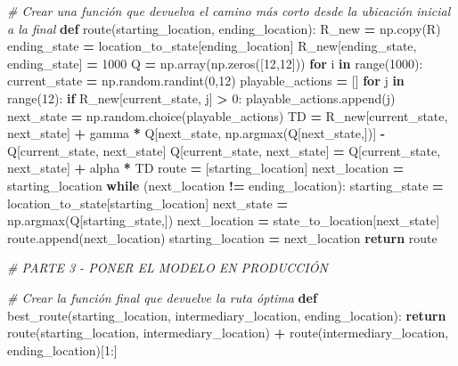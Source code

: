 \documentclass[
]{book}
\newenvironment{Shaded}{\begin{snugshade}}{\end{snugshade}}
\newcommand{\BuiltInTok}[1]{#1}
\newcommand{\CommentTok}[1]{\textcolor[rgb]{0.56,0.35,0.01}{\textit{#1}}}
\newcommand{\ControlFlowTok}[1]{\textcolor[rgb]{0.13,0.29,0.53}{\textbf{#1}}}
\newcommand{\DecValTok}[1]{\textcolor[rgb]{0.00,0.00,0.81}{#1}}
\newcommand{\KeywordTok}[1]{\textcolor[rgb]{0.13,0.29,0.53}{\textbf{#1}}}
\newcommand{\NormalTok}[1]{#1}
\newcommand{\OperatorTok}[1]{\textcolor[rgb]{0.81,0.36,0.00}{\textbf{#1}}}
\begin{document}
\begin{Shaded}
\begin{Highlighting}[]
\CommentTok{\# Crear una función que devuelva el camino más corto desde la ubicación inicial a la final}
\KeywordTok{def}\NormalTok{ route(starting\_location, ending\_location):}
\NormalTok{    R\_new }\OperatorTok{=}\NormalTok{ np.copy(R)}
\NormalTok{    ending\_state }\OperatorTok{=}\NormalTok{ location\_to\_state[ending\_location]}
\NormalTok{    R\_new[ending\_state, ending\_state] }\OperatorTok{=} \DecValTok{1000}
\NormalTok{    Q }\OperatorTok{=}\NormalTok{ np.array(np.zeros([}\DecValTok{12}\NormalTok{,}\DecValTok{12}\NormalTok{]))}
    \ControlFlowTok{for}\NormalTok{ i }\KeywordTok{in} \BuiltInTok{range}\NormalTok{(}\DecValTok{1000}\NormalTok{):}
\NormalTok{        current\_state }\OperatorTok{=}\NormalTok{ np.random.randint(}\DecValTok{0}\NormalTok{,}\DecValTok{12}\NormalTok{)}
\NormalTok{        playable\_actions }\OperatorTok{=}\NormalTok{ []}
        \ControlFlowTok{for}\NormalTok{ j }\KeywordTok{in} \BuiltInTok{range}\NormalTok{(}\DecValTok{12}\NormalTok{):}
            \ControlFlowTok{if}\NormalTok{ R\_new[current\_state, j] }\OperatorTok{\textgreater{}} \DecValTok{0}\NormalTok{:}
\NormalTok{                playable\_actions.append(j)}
\NormalTok{        next\_state }\OperatorTok{=}\NormalTok{ np.random.choice(playable\_actions)}
\NormalTok{        TD }\OperatorTok{=}\NormalTok{ R\_new[current\_state, next\_state]}
             \OperatorTok{+}\NormalTok{ gamma }\OperatorTok{*}\NormalTok{ Q[next\_state, np.argmax(Q[next\_state,])]}
             \OperatorTok{{-}}\NormalTok{ Q[current\_state, next\_state]}
\NormalTok{        Q[current\_state, next\_state] }\OperatorTok{=}\NormalTok{ Q[current\_state, next\_state] }\OperatorTok{+}\NormalTok{ alpha }\OperatorTok{*}\NormalTok{ TD}
\NormalTok{    route }\OperatorTok{=}\NormalTok{ [starting\_location]}
\NormalTok{    next\_location }\OperatorTok{=}\NormalTok{ starting\_location}
    \ControlFlowTok{while}\NormalTok{ (next\_location }\OperatorTok{!=}\NormalTok{ ending\_location):}
\NormalTok{        starting\_state }\OperatorTok{=}\NormalTok{ location\_to\_state[starting\_location]}
\NormalTok{        next\_state }\OperatorTok{=}\NormalTok{ np.argmax(Q[starting\_state,])}
\NormalTok{        next\_location }\OperatorTok{=}\NormalTok{ state\_to\_location[next\_state]}
\NormalTok{        route.append(next\_location)}
\NormalTok{        starting\_location }\OperatorTok{=}\NormalTok{ next\_location}
    \ControlFlowTok{return}\NormalTok{ route}

\CommentTok{\# PARTE 3 {-} PONER EL MODELO EN PRODUCCIÓN}

\CommentTok{\# Crear la función final que devuelve la ruta óptima}
\KeywordTok{def}\NormalTok{ best\_route(starting\_location, intermediary\_location, ending\_location):}
    \ControlFlowTok{return}\NormalTok{ route(starting\_location, intermediary\_location)}
           \OperatorTok{+}\NormalTok{ route(intermediary\_location, ending\_location)[}\DecValTok{1}\NormalTok{:]}


\end{Highlighting}
\end{Shaded}
\end{document}
